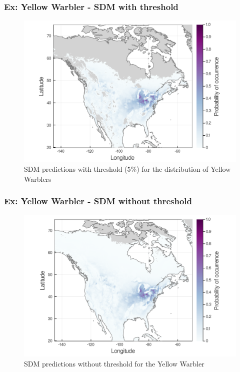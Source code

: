 \documentclass[10pt]{beamer}
\begin{document}
\begin{frame}
  \frametitle{Ex: Yellow Warbler - SDM with threshold}
  \begin{figure}
    \centering
    \hspace*{-0cm}\includegraphics[scale=0.17]{fig/01_sdm_singlesp-threshold.png}
    \caption{SDM predictions with threshold (5\%) for the distribution of Yellow Warblers}
  \end{figure}
\end{frame}

\begin{frame}
  \frametitle{Ex: Yellow Warbler - SDM without threshold}
  \begin{figure}
    \centering
    \hspace*{-0cm}\includegraphics[scale=0.17]{fig/01_sdm_singlesp.png}
    \caption{SDM predictions without threshold for the Yellow Warbler}
  \end{figure}
\end{frame}
\end{document}
